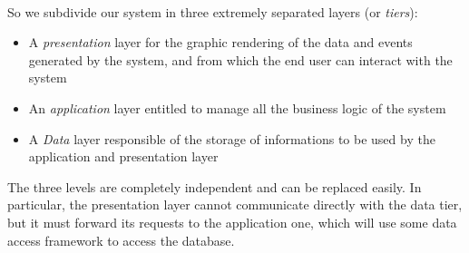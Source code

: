\paragraph{} So we subdivide our system in three extremely separated layers (or \textit{tiers}):
\begin{itemize}
	\item A \textit{presentation} layer for the graphic rendering of the data and events generated by the system, and from which the end user can interact with the system
	\item An \textit{application} layer entitled to manage all the business logic of the system
	\item A \textit{Data} layer responsible of the storage of informations to be used by the application and presentation layer
\end{itemize}
The three levels are completely independent and can be replaced easily. In particular, the presentation layer cannot communicate directly with the data tier, but it must forward its requests to the application one, which will use some data access framework to access the database.



